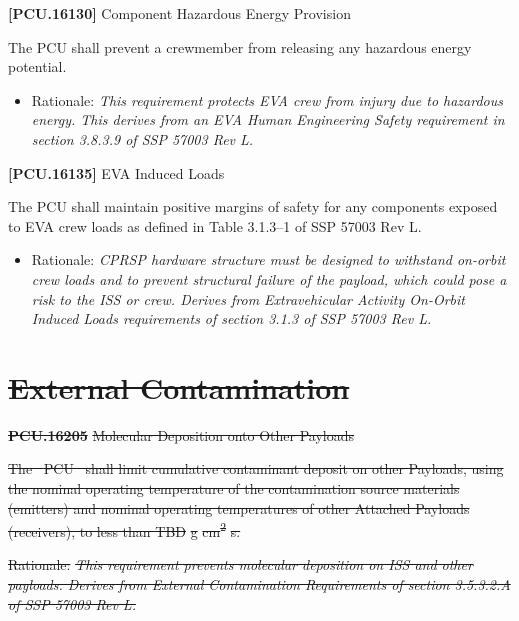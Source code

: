 \documentclass[12pt,oneside,oldfontcommands]{memoir}
\providecommand{\DIFdeltex}[1]{{\protect\color{red}\sout{#1}}}                      %
\providecommand{\DIFdelbegin}{} %
\providecommand{\DIFdel}[1]{\texorpdfstring{\DIFdeltex{#1}}{}} %
\newcommand{\DIFscaledelfig}{0.5}
\newlength{\DIFdelgraphicswidth} %
\newlength{\DIFdelgraphicsheight} %
\newcommand{\DIFdelincludegraphics}[2][]{%
\sbox{\DIFdelgraphicsbox}{\DIFOincludegraphics[#1]{#2}}%
\settoboxwidth{\DIFdelgraphicswidth}{\DIFdelgraphicsbox} %
\settoboxtotalheight{\DIFdelgraphicsheight}{\DIFdelgraphicsbox} %
\scalebox{\DIFscaledelfig}{%
\parbox[b]{\DIFdelgraphicswidth}{\usebox{\DIFdelgraphicsbox}\\[-\baselineskip] \rule{\DIFdelgraphicswidth}{0em}}\llap{\resizebox{\DIFdelgraphicswidth}{\DIFdelgraphicsheight}{%
\setlength{\unitlength}{\DIFdelgraphicswidth}%
\begin{picture}(1,1)%
\thicklines\linethickness{2pt} %
{\color[rgb]{1,0,0}\put(0,0){\framebox(1,1){}}}%
{\color[rgb]{1,0,0}\put(0,0){\line( 1,1){1}}}%
{\color[rgb]{1,0,0}\put(0,1){\line(1,-1){1}}}%
\end{picture}%
}\hspace*{3pt}}} %
} %
\DeclareRobustCommand{\DIFdelbegin}{\DIFOdelbegin \let\includegraphics\DIFdelincludegraphics} %
\begin{document}
\textbf{[PCU.16130]} Component Hazardous Energy Provision

The \gls{PCU} shall prevent a crewmember from releasing any hazardous energy potential.

\begin{itemize}
\item{} Rationale: \emph{This requirement protects EVA crew from injury due to hazardous energy. This derives from an EVA Human Engineering Safety requirement in section 3.8.3.9 of SSP 57003 Rev L.}

\end{itemize}

\textbf{[PCU.16135]} EVA Induced Loads

The \gls{PCU} shall maintain positive margins of safety for any components exposed to EVA crew loads as defined in Table 3.1.3--1 of SSP 57003 Rev L.

\begin{itemize}
\item{} Rationale: \emph{CPRSP hardware structure must be designed to withstand on-orbit crew loads and to prevent structural failure of the payload, which could pose a risk to the ISS or crew. Derives from Extravehicular Activity On-Orbit Induced Loads requirements of section 3.1.3 of SSP 57003 Rev L.}

\end{itemize}

\DIFdelbegin \section{\DIFdel{External Contamination}}
\addtocounter{section}{-1}%

\textbf{%
\DIFdel{PCU.16205}%
} %
\DIFdel{Molecular Deposition onto Other Payloads
}%

\DIFdel{The \mbox{%
\gls{PCU} }\hspace{0pt}%
shall limit cumulative contaminant deposit on other Payloads, using the nominal operating temperature of the contamination source materials (emitters) and nominal operating temperatures of other Attached Payloads (receivers), to less than TBD}%
\DIFdel{g}%
\DIFdel{cm\textsuperscript{2}}%
\DIFdel{s.
}%

\begin{itemize}%
\DIFdel{Rationale: }\emph{\DIFdel{This requirement prevents molecular deposition on ISS and other payloads. Derives from External Contamination Requirements of section 3.5.3.2.A of SSP 57003 Rev L.}}


\end{itemize}%
\end{document}
